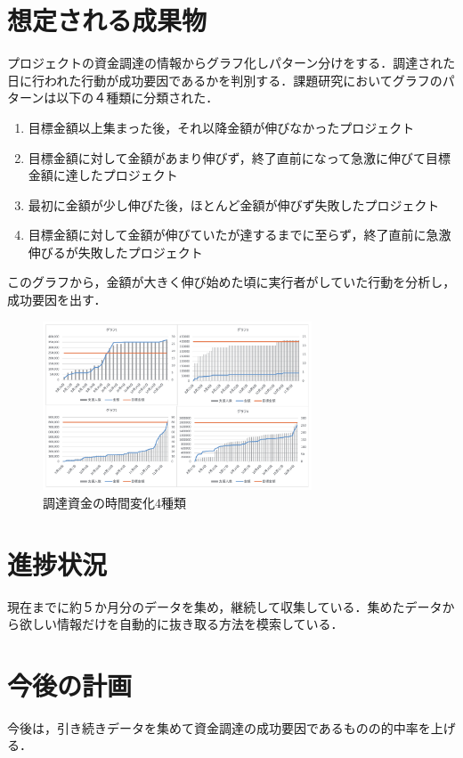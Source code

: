 \documentclass[uplatex,twocolumn,dvipdfmx]{jsarticle}
\begin{document}
\section{想定される成果物}
プロジェクトの資金調達の情報からグラフ化しパターン分けをする．調達された日に行われた行動が成功要因であるかを判別する．課題研究においてグラフのパターンは以下の４種類に分類された．
\begin{enumerate}
 \item 目標金額以上集まった後，それ以降金額が伸びなかったプロジェクト
 \item 目標金額に対して金額があまり伸びず，終了直前になって急激に伸びて目標金額に達したプロジェクト　
 \item 最初に金額が少し伸びた後，ほとんど金額が伸びず失敗したプロジェクト
 \item 目標金額に対して金額が伸びていたが達するまでに至らず，終了直前に急激伸びるが失敗したプロジェクト
\end{enumerate}
このグラフから，金額が大きく伸び始めた頃に実行者がしていた行動を分析し，成功要因を出す．
\begin{figure}[h]
\centering
\includegraphics[width=8cm,clip]{images.pdf}
\caption{調達資金の時間変化4種類}\label{サンプル図}
\end{figure}
\section{進捗状況}
現在までに約５か月分のデータを集め，継続して収集している．集めたデータから欲しい情報だけを自動的に抜き取る方法を模索している．
\section{今後の計画}
今後は，引き続きデータを集めて資金調達の成功要因であるものの的中率を上げる．



\end{document}
